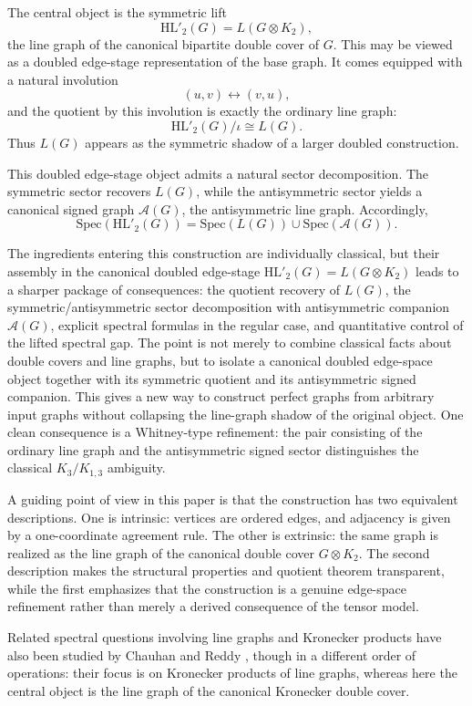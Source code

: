 \documentclass[11pt]{article}
\newcommand{\Spec}{\mathrm{Spec}}
\newcommand{\HL}{\mathrm{HL}}
\theoremstyle{plain}
\begin{document}
The central object is the symmetric lift
\[
\HL'_2(G)=L(G\otimes K_2),
\]
the line graph of the canonical bipartite double cover of \(G\). This may be viewed as a doubled edge-stage
representation of the base graph. It comes equipped with a natural involution
\[
(u,v)\leftrightarrow (v,u),
\]
and the quotient by this involution is exactly the ordinary line graph:
\[
\HL'_2(G)/\iota \cong L(G).
\]
Thus \(L(G)\) appears as the symmetric shadow of a larger doubled construction.

This doubled edge-stage object admits a natural sector decomposition. The symmetric sector recovers \(L(G)\),
while the antisymmetric sector yields a canonical signed graph $\mathcal A(G)$, the antisymmetric line graph.
Accordingly,
\[
\Spec(\HL'_2(G))=\Spec(L(G))\cup\Spec(\mathcal A(G)).
\]

The ingredients entering this construction are individually classical, but their assembly in the canonical doubled edge-stage \( \HL'_2(G)=L(G\otimes K_2) \) leads to a sharper package of consequences: the quotient recovery of \(L(G)\), the symmetric/antisymmetric sector decomposition with antisymmetric companion \(\mathcal A(G)\), explicit spectral formulas in the regular case, and quantitative control of the lifted spectral gap.
The point is not merely to combine classical facts about double covers and line graphs, but to isolate a canonical
doubled edge-space object together with its symmetric quotient and its antisymmetric signed companion. This gives a
new way to construct perfect graphs from arbitrary input graphs without collapsing the line-graph shadow
of the original object. One clean consequence is a Whitney-type refinement: the pair consisting of the
ordinary line graph and the antisymmetric signed sector distinguishes the classical \(K_3/K_{1,3}\)
ambiguity.

A guiding point of view in this paper is that the construction has two equivalent descriptions. One is intrinsic:
vertices are ordered edges, and adjacency is given by a one-coordinate agreement rule. The other is extrinsic:
the same graph is realized as the line graph of the canonical double cover \(G\otimes K_2\). The second
description makes the structural properties and quotient theorem transparent, while the first emphasizes that the
construction is a genuine edge-space refinement rather than merely a derived consequence of the tensor model.

Related spectral questions involving line graphs and Kronecker products have also been studied
by Chauhan and Reddy \cite{chauhan2025}, though in a different order of operations: their focus is on
Kronecker products of line graphs, whereas here the central object is the line graph of the canonical
Kronecker double cover.
\end{document}
